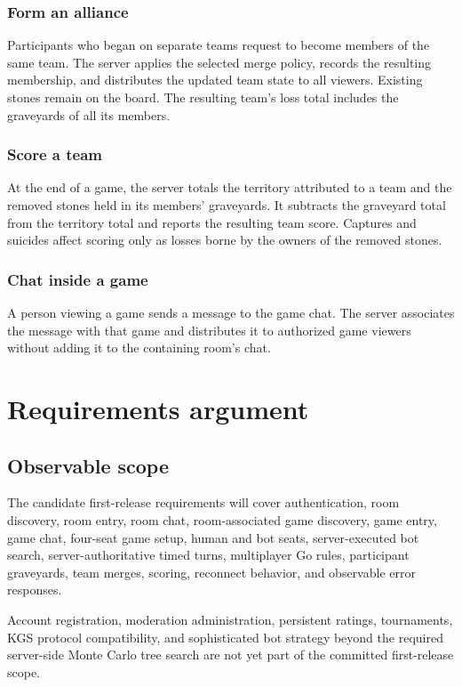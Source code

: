 \documentclass[11pt,oneside]{book}
\begin{document}
\subsection{Form an alliance}
Participants who began on separate teams request to become members of the same team. The server applies the selected merge policy, records the resulting membership, and distributes the updated team state to all viewers. Existing stones remain on the board. The resulting team's loss total includes the graveyards of all its members.

\subsection{Score a team}
At the end of a game, the server totals the territory attributed to a team and the removed stones held in its members' graveyards. It subtracts the graveyard total from the territory total and reports the resulting team score. Captures and suicides affect scoring only as losses borne by the owners of the removed stones.

\subsection{Chat inside a game}
A person viewing a game sends a message to the game chat. The server associates the message with that game and distributes it to authorized game viewers without adding it to the containing room's chat.

\chapter{Requirements argument}

\section{Observable scope}
The candidate first-release requirements will cover authentication, room discovery, room entry, room chat, room-associated game discovery, game entry, game chat, four-seat game setup, human and bot seats, server-executed bot search, server-authoritative timed turns, multiplayer Go rules, participant graveyards, team merges, scoring, reconnect behavior, and observable error responses.

Account registration, moderation administration, persistent ratings, tournaments, KGS protocol compatibility, and sophisticated bot strategy beyond the required server-side Monte Carlo tree search are not yet part of the committed first-release scope.
\end{document}
